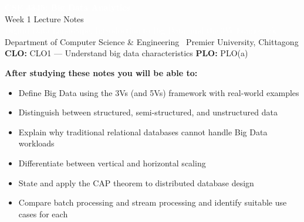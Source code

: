 \documentclass[12pt,a4paper]{article}
\begin{document}

\noindent
\colorbox{PUNavy}{%
  \begin{minipage}{\linewidth}
    \vspace{10pt}
    \begin{center}
      {\Large\bfseries\textcolor{white}{CSE 4345: Big Data Analytics}}\\[4pt]
      {\large\textcolor{PUGold}{Week 1 Lecture Notes}}\\[3pt]
      {\normalsize\textcolor{white}{Digital Data Landscape, Introduction to Big Data,
        and the 3Vs Framework}}\\[6pt]
      {\small\textcolor{PULightBlue}{Department of Computer Science \& Engineering
        \textbar\ Premier University, Chittagong}}\\[4pt]
      {\small\textcolor{PULightBlue}{\textbf{CLO:} CLO1 — Understand big data
        characteristics \quad\textbf{PLO:} PLO(a)}}
    \end{center}
    \vspace{8pt}
  \end{minipage}%
}

\vspace{14pt}

\noindent
\colorbox{PULightBlue!70}{%
  \begin{minipage}{\dimexpr\linewidth-2\fboxsep}
    \vspace{5pt}
    \textbf{\textcolor{PUNavy}{After studying these notes you will be able to:}}
    \begin{itemize}[nosep, leftmargin=1.5em, after=\vspace{4pt}]
      \item Define Big Data using the 3Vs (and 5Vs) framework with real-world examples
      \item Distinguish between structured, semi-structured, and unstructured data
      \item Explain why traditional relational databases cannot handle Big Data workloads
      \item Differentiate between vertical and horizontal scaling
      \item State and apply the CAP theorem to distributed database design
      \item Compare batch processing and stream processing and identify suitable use cases for each
    \end{itemize}
  \end{minipage}%
}
\end{document}

